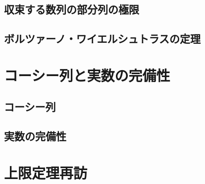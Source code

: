 \documentclass[../imaging-math]{subfiles}
\begin{document}

\subsection{収束する数列の部分列の極限}


\subsection{ボルツァーノ・ワイエルシュトラスの定理}


\section{コーシー列と実数の完備性}

\subsection{コーシー列}


\subsection{実数の完備性}


\section{上限定理再訪}

\end{document}
